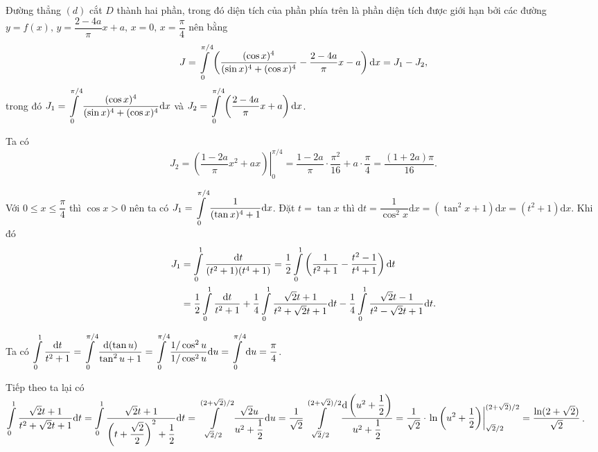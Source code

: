 \begin{enumerate}
{    Đường thẳng $(d)$ cắt $D$ thành hai phần, trong đó diện tích của phần phía trên là phần diện tích được giới hạn bởi các đường $y = f(x),\,y = \dfrac{2-4a}{\pi}x + a,\,x = 0,\,x = \dfrac{\pi}{4}$ nên bằng $$J = \int\displaylimits_{0}^{\pi/4}\left(\dfrac{(\cos x)^4}{(\sin x)^4 + (\cos x)^4} - \dfrac{2-4a}{\pi}x - a\right)\mathrm{d}x = J_1 - J_2,$$ trong đó $J_1 = \displaystyle\int\displaylimits_{0}^{\pi/4}\dfrac{(\cos x)^4}{(\sin x)^4 + (\cos x)^4}\mathrm{d}x$ và $J_2 = \displaystyle\int\displaylimits_{0}^{\pi/4}\left(\dfrac{2-4a}{\pi}x + a\right)\mathrm{d}x$.
    
    Ta có $$J_2 = \left.\left(\dfrac{1-2a}{\pi}x^2 + ax\right)\right|^{\pi/4}_{0} = \dfrac{1 - 2a}{\pi}\cdot \dfrac{\pi^2}{16} + a\cdot \dfrac{\pi}{4} = \dfrac{(1+2a)\pi}{16}.$$
    
    Với $0 \leq x \leq \dfrac{\pi}{4}$ thì $\cos x > 0$ nên ta có $J_1 = \displaystyle\int\displaylimits_{0}^{\pi/4}\dfrac{1}{(\tan x)^4 + 1}\mathrm{d}x$. Đặt $t = \tan x$ thì $\mathrm{d}t = \dfrac{1}{\cos^2 x}\mathrm{d}x = \left(\tan^2 x + 1\right)\mathrm{d}x = (t^2 + 1)\mathrm{d}x$. Khi đó 
    \begin{align*}
        J_1 &= \displaystyle\int\displaylimits_{0}^{1}\dfrac{\mathrm{d}t}{(t^2 + 1)(t^4 + 1)} = \dfrac{1}{2}\displaystyle\int\displaylimits_{0}^{1}\left(\dfrac{1}{t^2 + 1} - \dfrac{t^2 - 1}{t^4 + 1}\right)\mathrm{d}t \\
        &= \dfrac{1}{2}\int\displaylimits_{0}^{1}\dfrac{\mathrm{d}t}{t^2 + 1} + \dfrac{1}{4}\int\displaylimits_{0}^{1}\dfrac{\sqrt{2}t + 1}{t^2 + \sqrt{2}t + 1}\mathrm{d}t - \dfrac{1}{4}\int\displaylimits_{0}^{1}\dfrac{\sqrt{2}t - 1}{t^2 - \sqrt{2}t + 1}\mathrm{d}t.
    \end{align*}

    Ta có $\displaystyle\int\displaylimits_{0}^{1}\dfrac{\mathrm{d}t}{t^2 + 1} = \displaystyle\int\displaylimits_{0}^{\pi/4}\dfrac{\mathrm{d}(\tan u)}{\tan^2u + 1} = \displaystyle\int\displaylimits_{0}^{\pi/4}\dfrac{1/\cos^2u}{1/\cos^2u}\mathrm{d}u = \displaystyle\int\displaylimits_{0}^{\pi/4}\mathrm{d}u = \dfrac{\pi}{4}$.

    Tiếp theo ta lại có $\displaystyle\int\displaylimits_{0}^{1}\dfrac{\sqrt{2}t + 1}{t^2 + \sqrt{2}t + 1}\mathrm{d}t = \displaystyle\int\displaylimits_{0}^{1}\dfrac{\sqrt{2}t + 1}{\left(t + \dfrac{\sqrt{2}}{2}\right)^2 + \dfrac{1}{2}}\mathrm{d}t = \displaystyle\int\displaylimits_{\sqrt{2}/2}^{(2+\sqrt{2})/2}\dfrac{\sqrt{2}u}{u^2 + \dfrac{1}{2}}\mathrm{d}u = \dfrac{1}{\sqrt{2}}\displaystyle\int\displaylimits_{\sqrt{2}/2}^{(2+\sqrt{2})/2}\dfrac{\mathrm{d}\left(u^2 + \dfrac{1}{2}\right)}{u^2 + \dfrac{1}{2}} = \dfrac{1}{\sqrt{2}}\cdot \left.\ln \left(u^2 + \dfrac{1}{2}\right)\right|_{\sqrt{2}/2}^{(2+\sqrt{2})/2} = \dfrac{\ln (2 + \sqrt{2})}{\sqrt{2}}$.

}
\end{enumerate}
